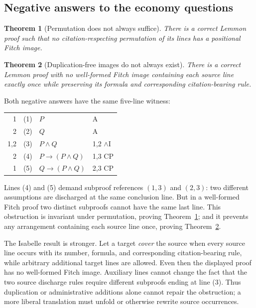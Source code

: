 \documentclass[11pt]{article}
\makeatletter
\theoremstyle{plain}
\newtheorem{theorem}{Theorem}
\theoremstyle{definition}
\theoremstyle{remark}
\newcommand{\dep}[1]{\textup{#1}}
\newenvironment{lemmonproof}
  {\begin{center}\begin{tabular}{@{}r@{\hspace{1.5em}}r@{\hspace{0.6em}}l@{\hspace{2.5em}}l@{}}}
  {\end{tabular}\end{center}}
\makeatother
\begin{document}
\subsection{Negative answers to the economy questions}

\begin{theorem}[Permutation does not always suffice]\label{conj:reorder}
There is a correct Lemmon proof such that no citation-respecting permutation
of its lines has a positional Fitch image.
\end{theorem}

\begin{theorem}[Duplication-free images do not always exist]
\label{conj:noduplication}
There is a correct Lemmon proof with no well-formed Fitch image containing
each source line exactly once while preserving its formula and corresponding
citation-bearing rule.
\end{theorem}

Both negative answers have the same five-line witness:

\begin{lemmonproof}
\dep{1}   & (1) & $P$                         & A \\
\dep{2}   & (2) & $Q$                         & A \\
\dep{1,2} & (3) & $P \wedge Q$                & 1,2 $\wedge$I \\
\dep{2}   & (4) & $P \to (P \wedge Q)$        & 1,3 CP \\
\dep{1}   & (5) & $Q \to (P \wedge Q)$        & 2,3 CP \\
\end{lemmonproof}

\noindent Lines (4) and (5) demand subproof references $(1,3)$ and $(2,3)$:
two different assumptions are discharged at the same conclusion line. But in
a well-formed Fitch proof two distinct subproofs cannot have the same last
line. This obstruction is invariant under permutation, proving
Theorem~\ref{conj:reorder}; and it prevents any arrangement containing each
source line once, proving Theorem~\ref{conj:noduplication}.

The Isabelle result is stronger. Let a target \emph{cover} the source when
every source line occurs with its number, formula, and corresponding
citation-bearing rule, while arbitrary additional target lines are allowed.
Even then the displayed proof has no well-formed Fitch image. Auxiliary lines
cannot change the fact that the two source discharge rules require different
subproofs ending at line (3). Thus duplication or administrative additions
alone cannot repair the obstruction; a more liberal translation must unfold
or otherwise rewrite source occurrences.
\end{document}
